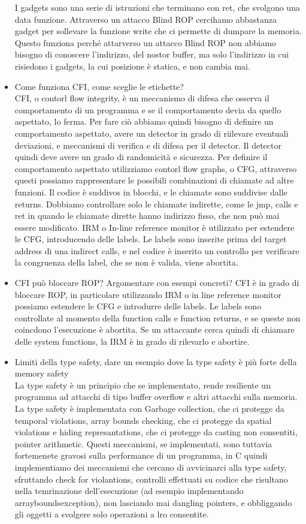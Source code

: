 \documentclass[11pt, oneside]{article}   	%
\begin{document}
\begin{itemize}
I gadgets sono una serie di istruzioni che terminano con ret, che svolgono una data funzione. Attraverso un attacco Blind ROP cercihamo abbastanza gadget per sollevare la funzione write che ci permette di dumpare la memoria. Questo funziona perché attarverso un attacco Blind ROP non abbiamo bisogno di conoscere l'indirizzo, del nostor buffer, ma solo l'indirizzo in cui risiedono i gadgets, la cui posizione è statica, e non cambia mai.
\item Come funziona CFI, come sceglie le etichette?\\
CFI, o contorl flow integrity, è un meccanismo di difesa che osserva il comportamento di un programma e se il comportamento devia da quello aspettato, lo ferma.
Per fare ciò abbiamo quindi bisogno di definire un comportamento aspettato, avere un detector in grado di riilevare eventuali deviazioni, e meccanismi di verifica e di difesa per il detector.
Il detector quindi deve avere un grado di randomicità e sicurezza. Per definire il comportamento aspettato utilizziamo contorl flow graphs, o CFG, attraverso questi possiamo rappresentare le possibili combinazioni di chiamate ad altre funzioni. Il codice è suddivos in blocchi, e le chiamate sono suddivise dalle returns. Dobbiamo controllare solo le chiamate indirette, come le jmp, calls e ret in quando le chiamate dirette hanno indirizzo fisso, che non può mai essere modificato.
IRM o In-line reference monitor è utilizzato per estendere le CFG, introducendo delle labels. Le labels sono inserite prima del target address di una indirect calls, e nel codice è inserito un controllo per verificare la congruenza della label, che se non è valida, viene abortita.
\item CFI può bloccare ROP? Argomentare con esempi concreti?
CFI è in grado di bloccare ROP, in particolare utilizzando IRM o in line reference monitor possiamo estendere le CFG e introdurre delle labels. Le labels sono controllate al momento della function calls e function returns, e se queste non coincdono l'esecuzione è abortita. Se un attaccante cerca quindi di chiamare delle system functions, la IRM è in grado di rilevarlo e abortire.
\item Limiti della type safety, dare un esempio dove la type safety è più forte della memory safety\\
La type safety è un principio che se implementato, rende resiliente un programma ad attacchi di tipo buffer overflow e altri attacchi sulla memoria. La type safety è implementata con Garbage collection, che ci protegge da temporal violations, array bounds checking, che ci protegge da spatial violations e hiding represantations, che ci protegge da casting non consentiti, pointer arithmetic. Questi meccanismi, se implementati, sono tuttavia fortemenete gravosi sulla performance di un programma, in C quindi implementiamo dei meccanismi che cercano di avvicinarci alla type safety, sfruttando check for violantions, controlli effettuati su codice che risultano nella temrinazione dell'esecuzione (ad esempio implementando arrayboundsexception), non lasciando mai dangling pointers, e obbliggando gli oggetti a svolgere solo operazioni a lro consentite.

\end{itemize}
\end{document}
